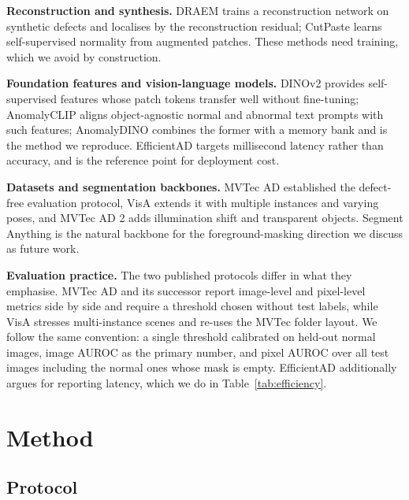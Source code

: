 \documentclass[10pt,twocolumn,letterpaper]{article}
\begin{document}
\textbf{Reconstruction and synthesis.} DRAEM \cite{zavrtanik2021draem} trains a
reconstruction network on synthetic defects and localises by the reconstruction
residual; CutPaste \cite{li2021cutpaste} learns self-supervised normality from
augmented patches. These methods need training, which we avoid by construction.

\textbf{Foundation features and vision-language models.} DINOv2
\cite{oquab2024dinov2} provides self-supervised features whose patch tokens
transfer well without fine-tuning; AnomalyCLIP \cite{zhou2024anomalyclip} aligns
object-agnostic normal and abnormal text prompts with such features;
AnomalyDINO \cite{damm2025anomalydino} combines the former with a memory bank
and is the method we reproduce. EfficientAD \cite{batzner2024efficientad}
targets millisecond latency rather than accuracy, and is the reference point for
deployment cost.

\textbf{Datasets and segmentation backbones.} MVTec AD \cite{bergmann2019mvtec}
established the defect-free evaluation protocol, VisA \cite{zou2022spot} extends
it with multiple instances and varying poses, and MVTec AD 2
\cite{hecklerkram2026mvtec2} adds illumination shift and transparent objects.
Segment Anything \cite{kirillov2023sam} is the natural backbone for the
foreground-masking direction we discuss as future work.

\textbf{Evaluation practice.} The two published protocols differ in what they
emphasise. MVTec AD and its successor \cite{bergmann2019mvtec,hecklerkram2026mvtec2}
report image-level and pixel-level metrics side by side and require a
threshold chosen without test labels, while VisA \cite{zou2022spot} stresses
multi-instance scenes and re-uses the MVTec folder layout. We follow the same
convention: a single threshold calibrated on held-out normal images, image AUROC
as the primary number, and pixel AUROC over all test images including the normal
ones whose mask is empty. EfficientAD \cite{batzner2024efficientad} additionally
argues for reporting latency, which we do in Table~\ref{tab:efficiency}.

\section{Method}

\subsection{Protocol}
\end{document}
